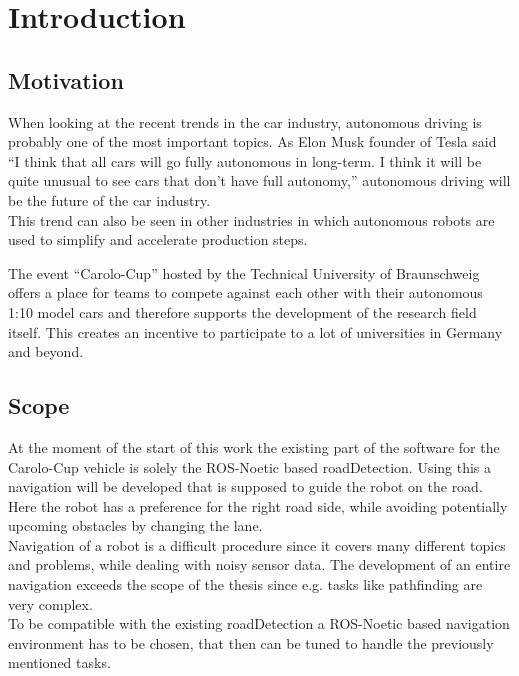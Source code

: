 \chapter{Introduction}
\label{introduction}


\section{Motivation}
When looking at the recent trends in the car industry, autonomous driving is probably one of the most important topics. As Elon Musk founder of Tesla said ``I think that all cars will go fully autonomous in long-term. I think it will be quite unusual to see cars that don’t have full autonomy,'' autonomous driving will be the future of the car industry\cite{musk}.\\

This trend can also be seen in other industries  in which autonomous robots are used to simplify and accelerate production steps. 

The event ``Carolo-Cup'' hosted by the Technical University of Braunschweig offers a place for teams to compete against each other with their autonomous 1:10 model cars and therefore supports the development of the research field itself. This creates an incentive to participate to a lot of universities in Germany and beyond.\\

\section{Scope}

At the moment of the start of this work the existing part of the software for the Carolo-Cup vehicle is solely the ROS-Noetic based roadDetection. Using this a navigation will be developed that is supposed to guide the robot on the road. Here the robot has a preference for the right road side, while avoiding potentially upcoming obstacles by changing the lane.\\

Navigation of a robot is a difficult procedure since it covers many different topics and problems, while dealing with noisy sensor data. The development of an entire navigation exceeds the scope of the thesis since e.g. tasks like pathfinding are very complex.\\

To be compatible with the existing roadDetection a ROS-Noetic based navigation environment has to be chosen, that then can be tuned to handle the previously mentioned tasks.\\

